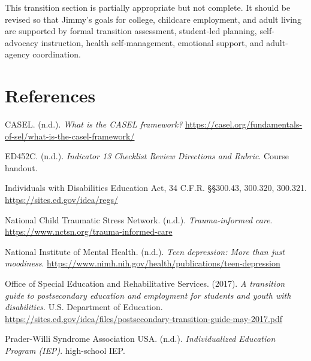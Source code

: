 \documentclass[11pt]{article}
\begin{document}
\begin{ReflectionBox}
This transition section is partially appropriate but not complete. It should be revised so that Jimmy's goals for college, childcare employment, and adult living are supported by formal transition assessment, student-led planning, self-advocacy instruction, health self-management, emotional support, and adult-agency coordination.
\end{ReflectionBox}

\newpage
\section*{References}
\small
CASEL. (n.d.). \textit{What is the CASEL framework?} \url{https://casel.org/fundamentals-of-sel/what-is-the-casel-framework/}

ED452C. (n.d.). \textit{Indicator 13 Checklist Review Directions and Rubric}. Course handout.

Individuals with Disabilities Education Act, 34 C.F.R. \S\S 300.43, 300.320, 300.321. \url{https://sites.ed.gov/idea/regs/}

National Child Traumatic Stress Network. (n.d.). \textit{Trauma-informed care}. \url{https://www.nctsn.org/trauma-informed-care}

National Institute of Mental Health. (n.d.). \textit{Teen depression: More than just moodiness}. \url{https://www.nimh.nih.gov/health/publications/teen-depression}

Office of Special Education and Rehabilitative Services. (2017). \textit{A transition guide to postsecondary education and employment for students and youth with disabilities}. U.S. Department of Education. \url{https://sites.ed.gov/idea/files/postsecondary-transition-guide-may-2017.pdf}

Prader-Willi Syndrome Association USA. (n.d.). \textit{Individualized Education Program (IEP)}. high-school IEP.
\end{document}
